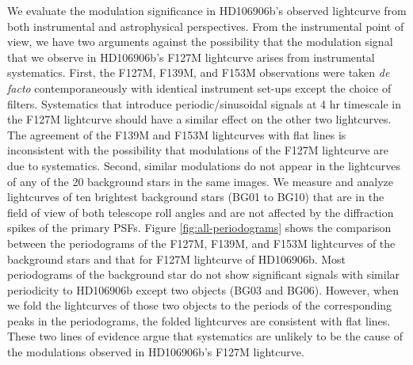 \documentclass[twocolumn, trackchanges]{aastex62}
\begin{document}
We evaluate the modulation significance in HD106906b's observed lightcurve from both instrumental and astrophysical perspectives. From the instrumental point of view, we have two arguments against the possibility that the modulation signal that we observe in HD106906b's F127M lightcurve arises from instrumental systematics. First, the F127M, F139M, and F153M observations were taken \emph{de facto} contemporaneously with identical instrument set-ups except the choice of filters. Systematics that introduce periodic/sinusoidal signals at 4 hr timescale in the F127M lightcurve should have a similar effect on the other two lightcurves. The agreement of the  F139M and F153M lightcurves with flat lines is inconsistent with the possibility that modulations of the F127M lightcurve {are} due to systematics. Second, similar modulations do not appear in the lightcurves of any of the 20 background stars in the same images. We measure and analyze lightcurves of ten brightest background stars (BG01 to BG10) that are in the field of view of both telescope roll angles and are not affected by the diffraction spikes of the primary PSFs.
Figure \ref{fig:all-periodograms} shows the comparison between the periodograms of the F127M, F139M, and F153M lightcurves of the background stars and that for F127M lightcurve of HD106906b. Most periodograms of the background star do not show significant signals with similar periodicity to HD106906b except two objects (BG03 and BG06). However, when we fold the lightcurves of those two objects to the periods of the corresponding peaks in the periodograms, the folded lightcurves are consistent with flat lines. These two lines of evidence argue that systematics are unlikely to be the cause of the modulations observed in HD106906b's F127M lightcurve.
\end{document}
